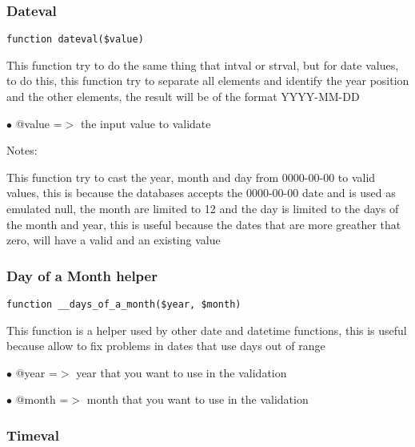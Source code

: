 \documentclass[a4paper]{article}
\begin{document}
\hypertarget{toc103}{}
\subsubsection{Dateval}

\begin{lstlisting}
function dateval($value)
\end{lstlisting}

This function try to do the same thing that intval or strval, but for date
values, to do this, this function try to separate all elements and identify
the year position and the other elements, the result will be of the format
YYYY-MM-DD

\begin{compactitem}
\item[\color{myblue}$\bullet$] @value =$>$ the input value to validate
\end{compactitem}

Notes:

This function try to cast the year, month and day from 0000-00-00 to valid
values, this is because the databases accepts the 0000-00-00 date and is used
as emulated null, the month are limited to 12 and the day is limited to the
days of the month and year, this is useful because the dates that are more
greather that zero, will have a valid and an existing value

\hypertarget{toc104}{}
\subsubsection{Day of a Month helper}

\begin{lstlisting}
function __days_of_a_month($year, $month)
\end{lstlisting}

This function is a helper used by other date and datetime functions, this
is useful because allow to fix problems in dates that use days out of range

\begin{compactitem}
\item[\color{myblue}$\bullet$] @year  =$>$ year that you want to use in the validation
\item[\color{myblue}$\bullet$] @month =$>$ month that you want to use in the validation
\end{compactitem}

\hypertarget{toc105}{}
\subsubsection{Timeval}
\end{document}
